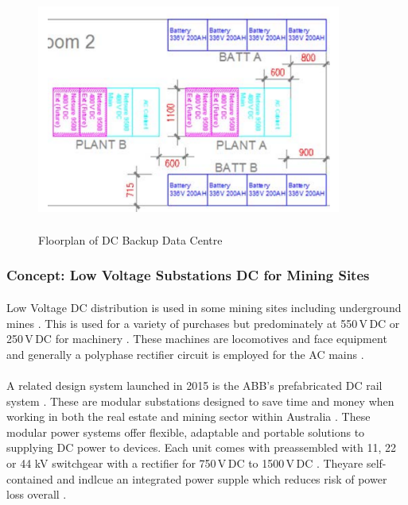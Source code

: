 \begin{figure}[H]
\hfill\includegraphics[width = 100mm, height = 80mm]{images/DC_Centre}\hspace*{\fill}
\caption{{Floorplan of DC Backup Data Centre \cite{Lisy2015}}}
\label{fig:DC_Centre}
\end{figure} 

\subsubsection{Concept: Low Voltage Substations DC for Mining Sites}

\paragraph{}
Low Voltage DC distribution is used in some mining sites including underground mines \cite{Morley1990}. This is used for a variety of purchases but predominately at 550\,V\,DC or 250\,V\,DC for machinery \cite{Morley1990}. These machines are locomotives and face equipment and generally a polyphase rectifier circuit is employed for the AC mains \cite{Morley1990}.

\paragraph{}
A related design system launched in 2015 is the ABB's prefabricated DC rail system \cite{website:ProQuest1}. These are modular substations designed to save time and money when working in both the real estate and mining sector within Australia \cite{website:ProQuest1}. These modular power systems offer flexible, adaptable and portable solutions to supplying DC power to devices. Each unit comes with preassembled with 11, 22 or 44 kV switchgear with a rectifier for 750\,V\,DC to 1500\,V\,DC \cite{website:ProQuest1}. Theyare self-contained and indlcue an integrated power supple which reduces risk of power loss overall \cite{website:ProQuest1}.            

